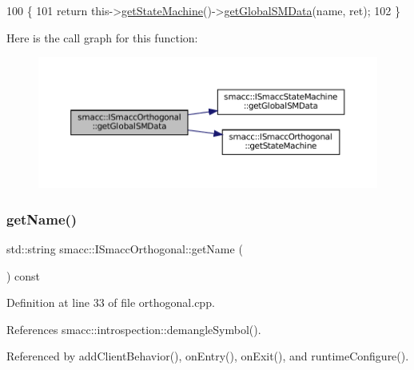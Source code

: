 \begin{DoxyCode}
100 \{
101     \textcolor{keywordflow}{return} this->\hyperlink{classsmacc_1_1ISmaccOrthogonal_aae265ec480b8ed552ddc79afd2d93a62}{getStateMachine}()->\hyperlink{classsmacc_1_1ISmaccStateMachine_aeda2d6813c6c428bf318a5792e014b61}{getGlobalSMData}(name, ret);
102 \}
\end{DoxyCode}
Here is the call graph for this function\+:
\nopagebreak
\begin{figure}[H]
\begin{center}
\leavevmode
\includegraphics[width=350pt]{classsmacc_1_1ISmaccOrthogonal_aa763280bc6980811744c8e8f11b2dcd0_cgraph}
\end{center}
\end{figure}
\mbox{\label{classsmacc_1_1ISmaccOrthogonal_a45a444be97410cb061f8b9d5d77ee9b7}} 
\subsubsection{\texorpdfstring{get\+Name()}{getName()}}
{\footnotesize\ttfamily std\+::string smacc\+::\+I\+Smacc\+Orthogonal\+::get\+Name (\begin{DoxyParamCaption}{ }\end{DoxyParamCaption}) const\hspace{0.3cm}{\ttfamily [virtual]}}



Definition at line 33 of file orthogonal.\+cpp.



References smacc\+::introspection\+::demangle\+Symbol().



Referenced by add\+Client\+Behavior(), on\+Entry(), on\+Exit(), and runtime\+Configure().


